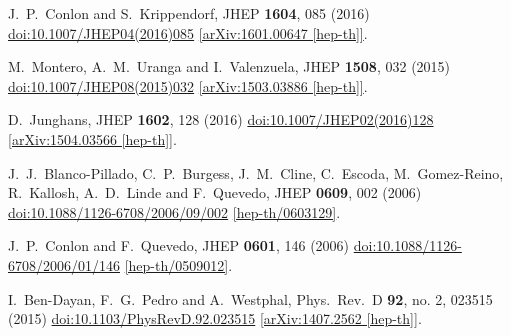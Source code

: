 \documentclass[12pt]{article}
\begin{document}
\begin{thebibliography}{99}
  J.~P.~Conlon and S.~Krippendorf,
  JHEP {\bf 1604}, 085 (2016)
  \href{https://dx.doi.org/10.1007/JHEP04(2016)085}{doi:10.1007/JHEP04(2016)085}
  \href{https://arxiv.org/abs/1601.00647}{[arXiv:1601.00647 [hep-th]]}.

  M.~Montero, A.~M.~Uranga and I.~Valenzuela,
  JHEP {\bf 1508}, 032 (2015)
  \href{https://dx.doi.org/10.1007/JHEP08(2015)032}{doi:10.1007/JHEP08(2015)032}
  \href{https://arxiv.org/abs/1503.03886}{[arXiv:1503.03886 [hep-th]]}.

  D.~Junghans,
  JHEP {\bf 1602}, 128 (2016)
  \href{https://dx.doi.org/10.1007/JHEP02(2016)128}{doi:10.1007/JHEP02(2016)128}
  \href{https://arxiv.org/abs/1504.03566}{[arXiv:1504.03566 [hep-th]]}.
%


  J.~J.~Blanco-Pillado, C.~P.~Burgess, J.~M.~Cline, C.~Escoda, M.~Gomez-Reino, R.~Kallosh, A.~D.~Linde and F.~Quevedo,
  JHEP {\bf 0609}, 002 (2006)
  \href{https://dx.doi.org/10.1088/1126-6708/2006/09/002}{doi:10.1088/1126-6708/2006/09/002}
  \href{https://arxiv.org/abs/hep-th/0603129}{[hep-th/0603129]}.

  J.~P.~Conlon and F.~Quevedo,
  JHEP {\bf 0601}, 146 (2006)
  \href{https://dx.doi.org/10.1088/1126-6708/2006/01/146}{doi:10.1088/1126-6708/2006/01/146}
  \href{https://arxiv.org/abs/hep-th/0509012}{[hep-th/0509012]}.

  I.~Ben-Dayan, F.~G.~Pedro and A.~Westphal,
  Phys.\ Rev.\ D {\bf 92}, no. 2, 023515 (2015)
  \href{https://dx.doi.org/10.1103/PhysRevD.92.023515}{doi:10.1103/PhysRevD.92.023515}
  \href{https://arxiv.org/abs/1407.2562}{[arXiv:1407.2562 [hep-th]]}.


\end{thebibliography}
\end{document}
